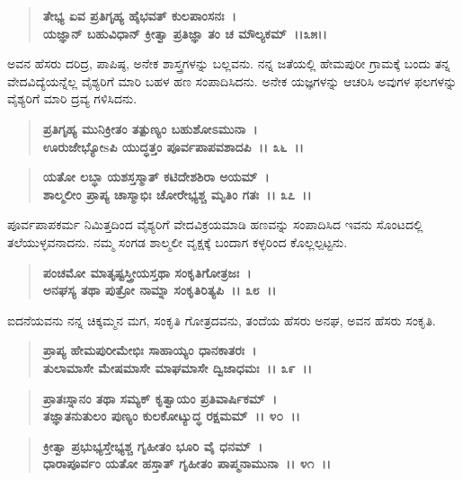 \begin{verse}
\textbf{ತೇಭ್ಯ ಏವ ಪ್ರತಿಗೃಹ್ಯ ಹೈಭವತ್ ಕುಲಪಾಂಸನಃ~।}\\\textbf{ಯಜ್ಞಾನ್ ಬಹುವಿಧಾನ್ ಕ್ರೀತ್ವಾ ಪ್ರತಿಜ್ಞಾ ತಂ ಚ ಮೌಲ್ಯಕಮ್~।।೩೫।।}
\end{verse}

ಅವನ ಹೆಸರು ದರಿದ್ರ, ಪಾಪಿಷ್ಠ, ಅನೇಕ ಶಾಸ್ತ್ರಗಳನ್ನು ಬಲ್ಲವನು. ನನ್ನ ಜತೆಯಲ್ಲಿ ಹೇಮಪುರೀ ಗ್ರಾಮಕ್ಕೆ ಬಂದು ತನ್ನ ವೇದವಿದ್ಯೆಯನ್ನೆಲ್ಲ ವೈಶ್ಯರಿಗೆ ಮಾರಿ ಬಹಳ ಹಣ ಸಂಪಾದಿಸಿದನು. ಅನೇಕ ಯಜ್ಞಗಳನ್ನು ಆಚರಿಸಿ ಅವುಗಳ ಫಲಗಳನ್ನು ವೈಶ್ಯರಿಗೆ ಮಾರಿ ದ್ರವ್ಯ ಗಳಿಸಿದನು.

\begin{verse}
\textbf{ಪ್ರತಿಗೃಹ್ಯ ಮುನಿಕ್ರೀತಂ ತತ್ಪುಣ್ಯಂ ಬಹುಶೋಽಮುನಾ~।}\\\textbf{ಊರುಜೇಭ್ಯೋsಪಿ ಯುದ್ಧತ್ತಂ ಪೂರ್ವಪಾಪವಶಾದಪಿ~।। ೩೬~।।}
\end{verse}

\begin{verse}
\textbf{ಯತೋ ಲಬ್ಧಾ ಯಶಸ್ತಸ್ಮಾತ್ ಕಟಿದೇಶಶಿರಾ ಅಯಮ್~।}\\\textbf{ಶಾಲ್ಮಲೀಂ ಪ್ರಾಪ್ಯ ಚಾಸ್ಮಾಭಿಃ ಚೋರೇಭ್ಯಶ್ಚ ಮೃತಿಂ ಗತಃ~।। ೩೭~।।}
\end{verse}

ಪೂರ್ವಪಾಪಕರ್ಮ ನಿಮಿತ್ತದಿಂದ ವೈಶ್ಯರಿಗೆ ವೇದವಿಕ್ರಯಮಾಡಿ ಹಣವನ್ನು ಸಂಪಾದಿಸಿದ ಇವನು ಸೊಂಟದಲ್ಲಿ ತಲೆಯುಳ್ಳವನಾದನು. ನಮ್ಮ ಸಂಗಡ ಶಾಲ್ಮಲೀ ವೃಕ್ಷಕ್ಕೆ ಬಂದಾಗ ಕಳ್ಳರಿಂದ ಕೊಲ್ಲಲ್ಪಟ್ಟನು.

\begin{verse}
\textbf{ಪಂಚಮೋ ಮಾತೃಷ್ಟಸ್ತ್ರೀಯಸ್ತಥಾ ಸಂಕೃತಿಗೋತ್ರಜಃ~।}\\\textbf{ಅನಘಸ್ಯ ತಥಾ ಪುತ್ರೋ ನಾಮ್ನಾ ಸಂಕೃತಿರಿತ್ಯಪಿ~।। ೩೮~।।}
\end{verse}

ಐದನೆಯವನು ನನ್ನ ಚಿಕ್ಕಮ್ಮನ ಮಗ, ಸಂಕೃತಿ ಗೋತ್ರದವನು, ತಂದೆಯ ಹೆಸರು ಅನಘ, ಅವನ ಹೆಸರು ಸಂಕೃತಿ.

\begin{verse}
\textbf{ಪ್ರಾಪ್ಯ ಹೇಮಪುರೀಮೇಭಿಃ ಸಾಹಾಯ್ಯಂ ಧಾನಕಾತರಃ~।}\\\textbf{ತುಲಾಮಾಸೇ ಮೇಷಮಾಸೇ ಮಾಘಮಾಸೇ ದ್ವಿಜಾಧಮಃ~।। ೩೯~।। }
\end{verse}

\begin{verse}
\textbf{ಪ್ರಾತಃಸ್ನಾನಂ ತಥಾ ಸಮ್ಯಕ್ ಕೃತ್ವಾಯಂ ಪ್ರತಿವಾರ್ಷಿಕಮ್~।}\\\textbf{ತಜ್ಞಾತನುತುಲಂ ಪುಣ್ಯಂ ಕುಲಕೋಟ್ಯುದ್ಧ ರಕ್ಷಮಮ್~।। ೪೦~।। }
\end{verse}

\begin{verse}
\textbf{ಕ್ರೀತ್ವಾ ಪ್ರಭುಭ್ಯಸ್ತೇಭ್ಯಶ್ಚ ಗೃಹೀತಂ ಭೂರಿ ವೈ ಧನಮ್~।}\\\textbf{ಧಾರಾಪೂರ್ವಂ ಯತೋ ಹಸ್ತಾತ್ ಗೃಹೀತಂ ಪಾಪ್ಮನಾಮುನಾ~।। ೪೧~।।}
\end{verse}

